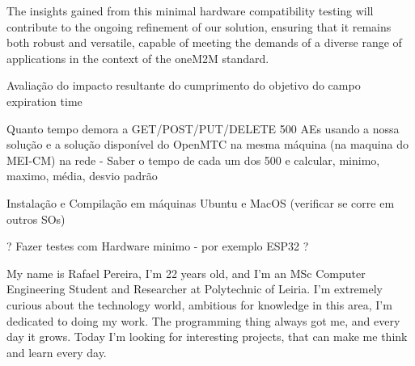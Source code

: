 \documentclass[a4paper,fleqn]{cas-dc}
\begin{document}
The insights gained from this minimal hardware compatibility testing will contribute to the ongoing refinement of our solution, ensuring that it remains both robust and versatile, capable of meeting the demands of a diverse range of applications in the context of the oneM2M standard.




Avaliação do impacto resultante do cumprimento do objetivo do campo expiration time

Quanto tempo demora a GET/POST/PUT/DELETE 500 AEs usando a nossa solução e a solução disponível do OpenMTC na mesma máquina (na maquina do MEI-CM) na rede - Saber o tempo de cada um dos 500 e calcular, minimo, maximo, média, desvio padrão

Instalação e Compilação em máquinas Ubuntu e MacOS (verificar se corre em outros SOs)

? Fazer testes com Hardware minimo - por exemplo ESP32 ?

\printcredits

%
%




My name is Rafael Pereira, I'm 22 years old, and I'm an MSc Computer Engineering Student and Researcher at Polytechnic of Leiria. I'm extremely curious about the technology world, ambitious for knowledge in this area, I'm dedicated to doing my work. The programming thing always got me, and every day it grows. Today I'm looking for interesting projects, that can make me think and learn every day.
\endbio
\end{document}
